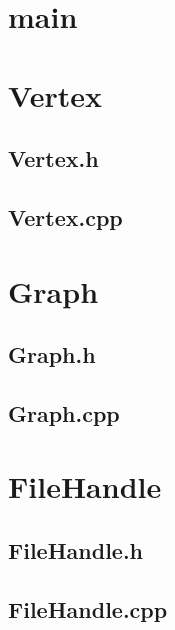 \appendices
\section{main}
\label{app:main}

\bigskip
\bigskip

\section{Vertex}
\label{app:Vertex}
\subsection{Vertex.h}
\label{app:vertex_h}

\bigskip
\bigskip

\subsection{Vertex.cpp}
\label{app:vertex_cpp}

\bigskip
\bigskip

\section{Graph}
\label{app:graph}
\subsection{Graph.h}
\label{app:graph_h}

\bigskip
\bigskip

\subsection{Graph.cpp}
\label{app:graph_cpp}

\bigskip
\bigskip

\section{FileHandle}
\label{app:FileHandle}
\subsection{FileHandle.h}
\label{app:FileHandle_h}

\bigskip
\bigskip

\subsection{FileHandle.cpp}
\label{app:FileHandle_cpp}

\bigskip
\bigskip

